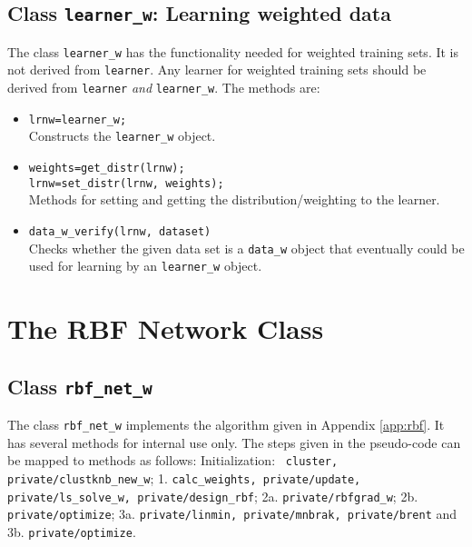 \documentclass{article}
\begin{document}
\subsection{Class {\tt learner\_w}: Learning weighted data}
The class {\tt learner\_w} has the functionality needed for weighted training
sets. It is not derived from {\tt learner}. Any learner for weighted training
sets should be derived from {\tt learner} {\em and} {\tt learner\_w}. The
methods are:
\begin{itemize}
\item {\tt lrnw=learner\_w;}\\
Constructs the {\tt learner\_w} object.
\item {\tt weights=get\_distr(lrnw);\\
    lrnw=set\_distr(lrnw, weights);}\\
  Methods for setting and getting the distribution/weighting to the learner.
\item {\tt data\_w\_verify(lrnw, dataset)}\\
  Checks whether the given data set is a {\tt data\_w} object that eventually
  could be used for learning by an {\tt learner\_w} object.
\end{itemize}

\section{The RBF Network Class}
\subsection{Class {\tt rbf\_net\_w}}
The class {\tt rbf\_net\_w} implements the algorithm given in Appendix
\ref{app:rbf}. It has several methods for internal use only. The steps given
in the pseudo-code can be mapped to methods as follows: Initialization: {\tt
  cluster, private/clustknb\_new\_w}; 1. {\tt calc\_weights, private/update,
  private/ls\_solve\_w, private/design\_rbf}; 2a. {\tt private/rbfgrad\_w};
2b. {\tt private/optimize}; 3a. {\tt private/linmin, private/mnbrak,
  private/brent} and 3b. {\tt private/optimize}.
\end{document}
